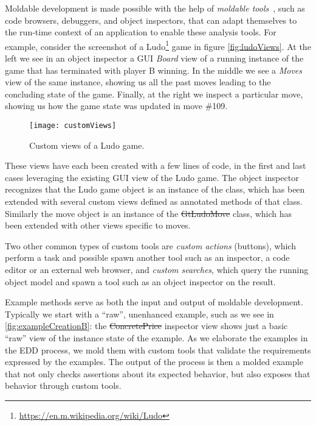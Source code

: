 \documentclass[sigplan,anonymous,review,10pt]{acmart}
\begin{document}
Moldable development is made possible with the help of \emph{moldable tools}~\cite{Chis17a}, such as code browsers, debuggers, and object inspectors, that can adapt themselves to the run-time context of an application to enable these analysis tools.
For example, consider the screenshot of a Ludo\footnote{\url{https://en.m.wikipedia.org/wiki/Ludo}} game in figure \autoref{fig:ludoViews}.
At the left we see in an object inspector a GUI \emph{Board} view of a running instance of the game that has terminated with player B winning.
In the middle we see a \emph{Moves} view of the same instance, showing us all the past moves leading to the concluding state of the game.
Finally, at the right we inspect a particular move, showing us how the game state was updated in move \#109.

\begin{figure}[h]
  \texttt{[image: customViews]}
  \caption{Custom views of a Ludo game.}
  \label{fig:ludoViews}
\end{figure}

These views have each been created with a few lines of code, in the first and last cases leveraging the existing GUI view of the Ludo game.
The object inspector recognizes that the Ludo game object is an instance of the  class, 
which has been extended with several custom views defined as annotated methods of that class.
Similarly the move object is an instance of the \st{GtLudoMove} class, which has been extended with other views specific to moves.

Two other common types of custom tools are \emph{custom actions} (\eg buttons), which perform a task and possible spawn another tool such as an inspector, a code editor or an external web browser, and \emph{custom searches}, which query the running object model and spawn a tool such as an object inspector on the result.

Example methods serve as both the input and output of moldable development.
Typically we start with a ``raw'', unenhanced example, such as we see in \autoref{fig:exampleCreationB}: the \st{ConcretePrice} inspector view shows just a basic ``raw'' view of the instance state of the example.
As we elaborate the examples in the EDD process, we mold them with custom tools that validate the requirements expressed by the examples.
The output of the process is then a molded example that not only checks assertions about its expected behavior, but also exposes that behavior through custom tools.
\end{document}
